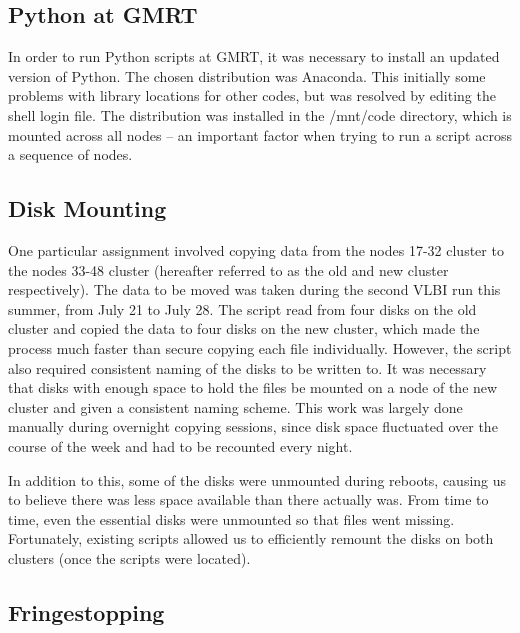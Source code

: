 \documentclass[a4paper,12pt]{article}
\begin{document}
\subsection{Python at GMRT}
\label{sec:pythonatgmrt}

In order to run Python scripts at GMRT, it was necessary to install an updated version of Python. The chosen distribution was Anaconda. This initially some problems with library locations for other codes, but was resolved by editing the shell login file. The distribution was installed in the /mnt/code directory, which is mounted across all nodes – an important factor when trying to run a script across a sequence of nodes.

\subsection{Disk Mounting}
\label{sec:diskmount}

One particular assignment involved copying data from the nodes 17-32 cluster to the nodes 33-48 cluster (hereafter referred to as the old and new cluster respectively). The data to be moved was taken during the second VLBI run this summer, from July 21 to July 28. The script read from four disks on the old cluster and copied the data to four disks on the new cluster, which made the process much faster than secure copying each file individually. However, the script also required consistent naming of the disks to be written to. It was necessary that disks with enough space to hold the files be mounted on a node of the new cluster and given a consistent naming scheme. This work was largely done manually during overnight copying sessions, since disk space fluctuated over the course of the week and had to be recounted every night.

In addition to this, some of the disks were unmounted during reboots, causing us to believe there was less space available than there actually was. From time to time, even the essential disks were unmounted so that files went missing. Fortunately, existing scripts allowed us to efficiently remount the disks on both clusters (once the scripts were located).

\subsection{Fringestopping}
\label{sec:fringestopping}
\end{document}
